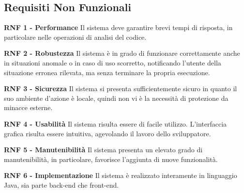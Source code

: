 		\subsection{Requisiti Non Funzionali}
		\begin{list}{-}{}
		
			\item \textbf{RNF 1 - Performance}
			\newline Il sistema deve garantire brevi tempi di risposta, in particolare nelle operazioni di analisi del codice.  
			\item \textbf{RNF 2 - Robustezza}
			\newline Il sistema è in grado di funzionare correttamente anche in situazioni anomale o in caso di uso scorretto, notificando l'utente della situazione erronea rilevata, ma senza terminare la propria esecuzione. 
			\item \textbf{RNF 3 - Sicurezza}
			\newline Il sistema si presenta sufficientemente sicuro in quanto il suo ambiente d'azione è locale, quindi non vi è la necessità di protezione da minacce esterne.
			\item \textbf{RNF 4 - Usabilità}
			\newline Il sistema risulta essere di facile utilizzo. L'interfaccia grafica risulta essere intuitiva, agevolando il lavoro dello sviluppatore. 
			\item \textbf{RNF 5 - Manutenibilità}
			\newline Il sistema presenta un elevato grado di manutenibilità, in particolare, favorisce l'aggiunta di nuove funzionalità.
			\item \textbf{RNF 6 - Implementazione}
			\newline Il sistema è realizzato interamente in linguaggio Java, sia parte back-end che front-end. 
	\end{list}


